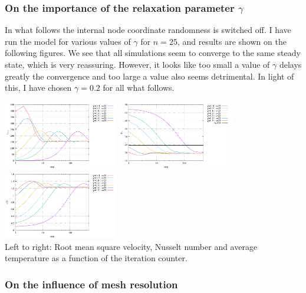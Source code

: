 \subsubsection*{On the importance of the relaxation parameter $\gamma$}

In what follows the internal node coordinate randomness is switched off.
I have run the model for various values of $\gamma$ for $n=25$, and results are shown on the 
following figures. We see that all simulations seem to converge to the same 
steady state, which is very reassuring. However, it looks like too small a value of $\gamma$
delays greatly the convergence and too large a value also seems detrimental. 
In light of this, I have chosen $\gamma=0.2$ for all what follows.

\begin{center}
\includegraphics[width=5cm]{python_codes/fieldstone_51/images/vrms_gammas.pdf}
\includegraphics[width=5cm]{python_codes/fieldstone_51/images/Nu_gammas.pdf}
\includegraphics[width=5cm]{python_codes/fieldstone_51/images/avrgT_gammas.pdf}\\
{\small Left to right: Root mean square velocity, Nusselt number and average temperature as a function 
of the iteration counter.}
\end{center}

\subsubsection*{On the influence of mesh resolution} 

